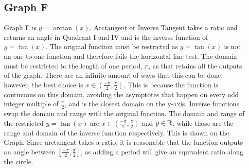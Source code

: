 \subsection{Graph F}

Graph F is ${y=\arctan(x)}$.
Arctangent or Inverse Tangent takes a ratio and returns an angle in Quadrant I and IV and is the inverse function of ${y=\tan(x)}$.
The original function must be restricted as ${y=\tan(x)}$ is not an one-to-one function and therefore fails the horizontal line test.
The domain must be restricted to the length of one period, $\pi$, as that retains all the outputs of the graph.
There are an infinite amount of ways that this can be done; however, the best choice is ${x \in {(\frac{-\pi}{2}, \frac{\pi}{2})}}$.
This is because the function is continuous on this domain, avoiding the asymptotes that happen on every odd integer multiple of ${\frac{\pi}{2}}$, and is the closest domain on the y-axis.
Inverse functions swap the domain and range with the original function.
The domain and range of the restricted ${y=\tan(x)}$ are ${x \in {(\frac{-\pi}{2}, \frac{\pi}{2})}}$ and ${y \in \mathbb{R}}$, while those are the range and domain of the inverse function respectively.
This is shown on the Graph.
Since arctangent takes a ratio, it is reasonable that the function outputs an angle between ${[\frac{-\pi}{2}, \frac{\pi}{2}]}$, as adding a period will give an equivalent ratio along the circle.
